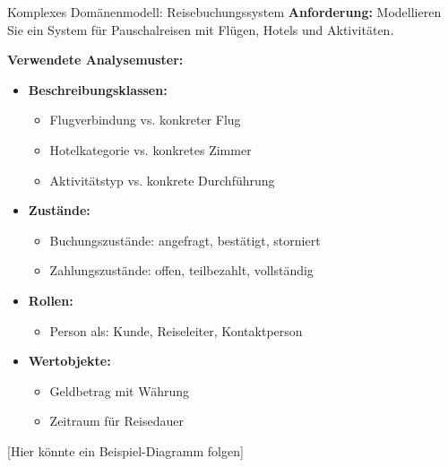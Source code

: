 \begin{example}{Komplexes Domänenmodell: Reisebuchungssystem}
\textbf{Anforderung:} Modellieren Sie ein System für Pauschalreisen mit Flügen, Hotels und Aktivitäten.

\textbf{Verwendete Analysemuster:}
\begin{itemize}
    \item \textbf{Beschreibungsklassen:}
    \begin{itemize}
        \item Flugverbindung vs. konkreter Flug
        \item Hotelkategorie vs. konkretes Zimmer
        \item Aktivitätstyp vs. konkrete Durchführung
    \end{itemize}
    
    \item \textbf{Zustände:}
    \begin{itemize}
        \item Buchungszustände: angefragt, bestätigt, storniert
        \item Zahlungszustände: offen, teilbezahlt, vollständig
    \end{itemize}
    
    \item \textbf{Rollen:}
    \begin{itemize}
        \item Person als: Kunde, Reiseleiter, Kontaktperson
    \end{itemize}
    
    \item \textbf{Wertobjekte:}
    \begin{itemize}
        \item Geldbetrag mit Währung
        \item Zeitraum für Reisedauer
    \end{itemize}
\end{itemize}
[Hier könnte ein Beispiel-Diagramm folgen]
\end{example}

